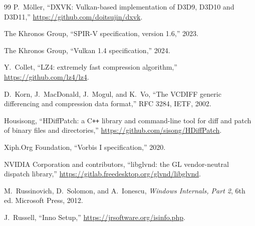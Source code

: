 \documentclass[conference,10pt]{IEEEtran}
\begin{document}
\begin{thebibliography}{99}
P.~Möller, ``DXVK: Vulkan-based implementation of D3D9, D3D10 and D3D11,''
\url{https://github.com/doitsujin/dxvk}.

The Khronos Group, ``SPIR-V specification, version 1.6,'' 2023.

The Khronos Group, ``Vulkan 1.4 specification,'' 2024.

Y.~Collet, ``LZ4: extremely fast compression algorithm,''
\url{https://github.com/lz4/lz4}.

D.~Korn, J.~MacDonald, J.~Mogul, and K.~Vo, ``The VCDIFF generic differencing
and compression data format,'' RFC 3284, IETF, 2002.

Housisong, ``HDiffPatch: a C\texttt{++} library and command-line tool for diff
and patch of binary files and directories,''
\url{https://github.com/sisong/HDiffPatch}.

Xiph.Org Foundation, ``Vorbis I specification,'' 2020.

NVIDIA Corporation and contributors, ``libglvnd: the GL vendor-neutral
dispatch library,'' \url{https://gitlab.freedesktop.org/glvnd/libglvnd}.

M.~Russinovich, D.~Solomon, and A.~Ionescu, \emph{Windows Internals, Part 2},
6th ed. Microsoft Press, 2012.

J.~Russell, ``Inno Setup,'' \url{https://jrsoftware.org/isinfo.php}.

\end{thebibliography}
\end{document}
